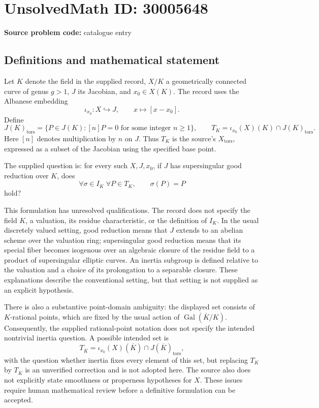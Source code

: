 \documentclass[11pt]{article}
\begin{document}
\section*{UnsolvedMath ID: 30005648}
\textbf{Source problem code:} catalogue entry
\subsection{Definitions and mathematical statement}
Let \(K\) denote the field in the supplied record, \(X/K\) a geometrically connected curve of genus \(g>1\), \(J\) its Jacobian, and \(x_0\in X(K)\). The record uses the Albanese embedding
\[
\iota_{x_0}\colon X\hookrightarrow J,\qquad x\longmapsto [x-x_0].
\]
Define
\[
J(K)_{\mathrm{tors}}=\{P\in J(K): [n]P=0\text{ for some integer }n\geq 1\},
\qquad
T_K=\iota_{x_0}(X)(K)\cap J(K)_{\mathrm{tors}}.
\]
Here \([n]\) denotes multiplication by \(n\) on \(J\). Thus \(T_K\) is the source's \(X_{\mathrm{tors}}\), expressed as a subset of the Jacobian using the specified base point.

The supplied question is: for every such \(X,J,x_0\), if \(J\) has supersingular good reduction over \(K\), does
\[
\forall\sigma\in I_K\;\forall P\in T_K,\qquad \sigma(P)=P
\]
hold?

This formulation has unresolved qualifications. The record does not specify the field \(K\), a valuation, its residue characteristic, or the definition of \(I_K\). In the usual discretely valued setting, good reduction means that \(J\) extends to an abelian scheme over the valuation ring; supersingular good reduction means that its special fiber becomes isogenous over an algebraic closure of the residue field to a product of supersingular elliptic curves. An inertia subgroup is defined relative to the valuation and a choice of its prolongation to a separable closure. These explanations describe the conventional setting, but that setting is not supplied as an explicit hypothesis.

There is also a substantive point-domain ambiguity: the displayed set consists of \(K\)-rational points, which are fixed by the usual action of \(\operatorname{Gal}(\overline K/K)\). Consequently, the supplied rational-point notation does not specify the intended nontrivial inertia question. A possible intended set is
\[
T_{\overline K}=\iota_{x_0}(X)(\overline K)\cap J(\overline K)_{\mathrm{tors}},
\]
with the question whether inertia fixes every element of this set, but replacing \(T_K\) by \(T_{\overline K}\) is an unverified correction and is not adopted here. The source also does not explicitly state smoothness or properness hypotheses for \(X\). These issues require human mathematical review before a definitive formulation can be accepted.
\end{document}
